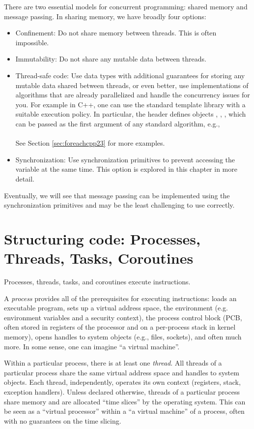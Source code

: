 There are two essential models for concurrent programming: shared memory and message passing. In sharing memory, we have broadly four options:
\begin{itemize}
\item Confinement: Do not share memory between threads. This is often impossible.
\item Immutability: Do not share any mutable data between threads. 
\item Thread-safe code: Use data types with additional guarantees for storing any mutable data shared between threads, or even better, use implementations of algorithms that are already parallelized and handle the concurrency issues for you. For example in C++, one can use the standard template library with a suitable execution policy. In particular, the header  defines objects , , , which can be passed as the first argument of any standard algorithm, e.g., \\
\\
See Section \ref{sec:foreachcpp23} for more examples.
\item Synchronization: Use synchronization primitives to prevent accessing the variable at the same time. This option is explored in this chapter in more detail. 
\end{itemize}
Eventually, we will see that message passing can be implemented using the synchronization primitives and may be the least challenging to use correctly. 

\section{Structuring code: Processes, Threads, Tasks, Coroutines}

Processes, threads, tasks, and coroutines execute instructions. 

A \emph{process} provides all of the prerequisites for executing instructions: loads an executable program, sets up a virtual address space, the environment (e.g. environment variables and a security context), the process control block (PCB, often stored in registers of the processor and on a per-process stack in kernel memory), opens handles to system objects (e.g., files, sockets), and often much more. In some sense, one can imagine ``a virtual machine''.

Within a particular process, there is at least one \emph{thread}. All threads of a particular process share the same virtual address space and handles to system objects. Each thread, independently, operates its own context (registers, stack, exception handlers). Unless declared otherwise, threads of a particular process share memory and are allocated ``time slices'' by the operating system. This can be seen as a ``virtual processor'' within a ``a virtual machine'' of a process, often with no guarantees on the time slicing.

